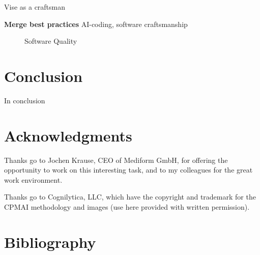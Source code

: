 \documentclass[twocolumn]{article}
\begin{document}
Vise as a craftsman
\begin{compactenum}
\item {\bfseries Merge best practices} AI-coding, software craftsmanship
\end{compactenum}

\begin{figure}[hbt!]
\begin{center}
\caption{Software Quality}
\label{fig:swqual}
\end{center}
\end{figure}


\section{Conclusion}

In conclusion

\section{Acknowledgments}

Thanks go to Jochen Krause, CEO of Mediform GmbH, for offering the opportunity to work on this interesting task, and to my colleagues for the great work environment.

Thanks go to Cognilytica, LLC, which have the copyright and trademark for the CPMAI methodology and images (use here provided with written permission).


\section{Bibliography}

%

\end{document}
